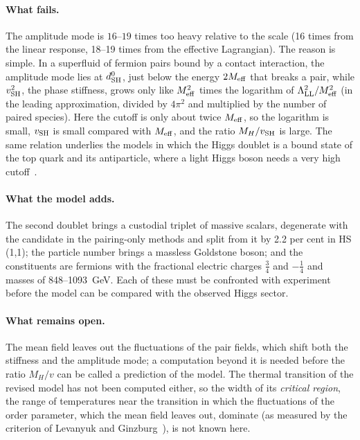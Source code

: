 \documentclass[aps,prd,twocolumn,superscriptaddress,nofootinbib,floatfix,longbibliography]{revtex4-2}
\newcommand{\LL}{{\rm LL}}
\newcommand{\SH}{{\rm SH}}
\begin{document}
\paragraph*{What fails.}
The amplitude mode is \ensuremath{16}\mbox{--}\ensuremath{19} times too heavy relative to the scale (16 times from the linear
response, 18\mbox{--}19 times from the effective Lagrangian). The reason is simple. In a superfluid of fermion pairs
bound by a contact interaction, the amplitude mode lies at $d^0_\SH$, just below the energy $2M_{\rm eff}$ that breaks a
pair, while $v_\SH^2$, the phase stiffness, grows only like $M_{\rm eff}^2$ times the logarithm of
$\Lambda_\LL^2/M_{\rm eff}^2$ (in the leading approximation, divided by $4\pi^2$ and multiplied by the number of paired
species). Here the cutoff is only about twice $M_{\rm eff}$, so the logarithm is small, $v_\SH$ is small compared with
$M_{\rm eff}$, and the ratio $M_H/v_\SH$ is large. The same relation underlies the models in which the Higgs doublet is a
bound state of the top quark and its antiparticle, where a light Higgs boson needs a very high cutoff~\cite{BHL1990}.

\paragraph*{What the model adds.}
The second doublet brings a custodial triplet of massive scalars, degenerate with the candidate in the pairing-only
methods and split from it by 2.2 per cent in HS (1,1); the particle number brings a massless Goldstone
boson; and the constituents are fermions with the fractional electric charges $\frac34$ and $-\frac14$ and masses of
848\mbox{--}1093~GeV. Each of these must be confronted with experiment before the model can be compared with the
observed Higgs sector.

\paragraph*{What remains open.}
The mean field leaves out the fluctuations of the pair fields, which shift both the stiffness and the amplitude mode; a
computation beyond it is needed before the ratio $M_H/v$ can be called a prediction of the model. The thermal transition
of the revised model has not been computed either, so the width of its \emph{critical region}, the range of temperatures
near the transition in which the fluctuations of the order parameter, which the mean field leaves out, dominate (as
measured by the criterion of Levanyuk and Ginzburg~\cite{Levanyuk1959,Ginzburg1960}), is not known here.
\end{document}

